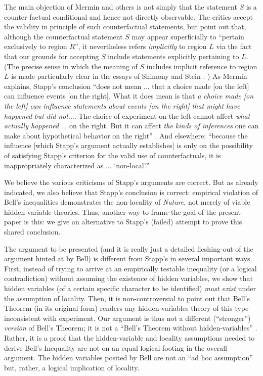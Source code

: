 \documentclass[aps,prc,onecolumn,12pt]{revtex4-2}
\begin{document}
The main objection of Mermin and others is not
simply that the statement $S$ is a counter-factual conditional and
hence not directly observable.  The critics accept the validity in
principle of such counterfactual statements, but point out that,
although the counterfactual statement $S$ may appear superficially to
``pertain exclusively to region $R$'', it nevertheless refers
\emph{implicitly} to region $L$ via the fact that our grounds for
accepting $S$ include statements explicitly pertaining to $L$.
(The precise
sense in which the meaning of $S$ includes implicit
reference to region $L$ is
made particularly clear in the essays of Shimony and
Stein \cite{shimony,shimonystein}. )    As Mermin explains,
Stapp's conclusion ``does not mean ... that a choice
  made [on the left] can influence events [on the right].  What it
  does mean is that \emph{a choice made [on the left] can influence
  statements about events [on the right] that might have happened but
  did not}....  The choice of experiment on the left cannot affect
  \emph{what actually happened} ... on the right.  But it can affect
  \emph{the kinds of inferences} one can make about hypothetical
  behavior on the right'' \cite{mermin}.  And elsewhere:  ``because the
  influence [which Stapp's argument actually establishes] is only on
  the possibility of satisfying Stapp's criterion for the valid use
  of counterfactuals, it is inappropriately characterized as ...
  `non-local'.'' \cite{mermin2}

We believe the various criticisms of Stapp's arguments are correct.
But as already indicated, we also believe that Stapp's conclusion is correct:
empirical violation of
Bell's inequalities demonstrates the non-locality of \emph{Nature}, not
merely of viable hidden-variable theories.  Thus, another way to frame
the goal of the present paper is this:  we give an alternative to
Stapp's (failed) attempt to prove this shared conclusion.

The argument to be presented (and it is really just a detailed
fleshing-out of the argument hinted at by Bell)
is different from Stapp's in several
important ways.  First, instead of trying to arrive at an empirically
testable inequality (or a logical contradiction) without
assuming the existence of hidden
variables, we show that hidden variables (of a certain specific
character to be identified) \emph{must exist} under the assumption of
locality.  Then, it is non-controversial to point out that Bell's
Theorem (in its original form) renders any hidden-variables theory
of this type
inconsistent with experiment.  Our argument is thus not a different
(``stronger'') \emph{version} of Bell's Theorem; it is not a ``Bell's
Theorem without hidden-variables'' \cite{bellwohv}.
Rather, it is a proof that the hidden-variable and locality
assumptions needed to derive Bell's Inequality are not on an equal
logical footing in the overall argument.
The hidden variables posited by Bell are
not an ``ad hoc assumption'' but, rather, a logical implication
of locality.
\end{document}
